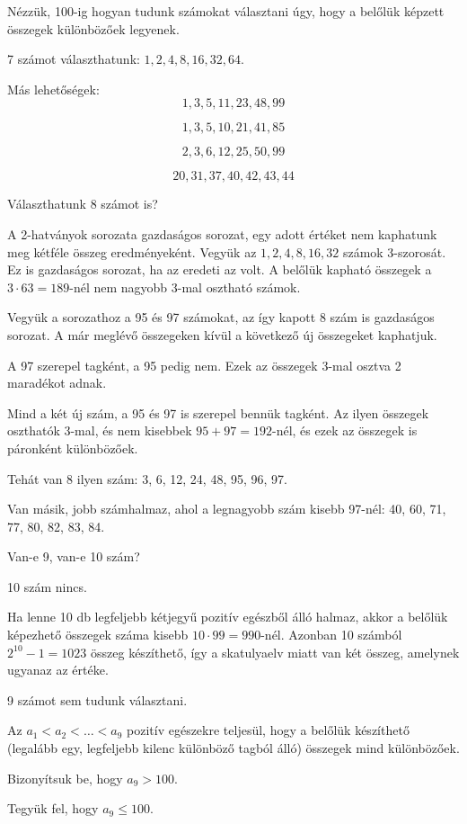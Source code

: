 \begin{solution}
	Nézzük, 100-ig hogyan tudunk számokat választani úgy, hogy a belőlük
	képzett összegek különbözőek legyenek.
	
	7 számot választhatunk: $1,2,4,8,16,32,64$.
	
	Más lehetőségek: 
	\[
	1,3,5,11,23,48,99
	\]
	
	\[
	1,3,5,10,21,41,85
	\]
	
	\[
	2,3,6,12,25,50,99
	\]
	
	\[
	20,31,37,40,42,43,44
	\]
	
	Választhatunk 8 számot is?
	
	A 2-hatványok sorozata gazdaságos sorozat, egy adott értéket nem kaphatunk
	meg kétféle összeg eredményeként. Vegyük az $1,2,4,8,16,32$ számok
	3-szorosát. Ez is gazdaságos sorozat, ha az eredeti az volt. A belőlük
	kapható összegek a $3\cdot63=189$-nél nem nagyobb 3-mal osztható
	számok.
	
	Vegyük a sorozathoz a 95 és 97 számokat, az így kapott 8 szám is gazdaságos
	sorozat. A már meglévő összegeken kívül a következő új összegeket
	kaphatjuk.
	
	A 97 szerepel tagként, a 95 pedig nem. Ezek az összegek 3-mal osztva
	2 maradékot adnak.
	
	Mind a két új szám, a 95 és 97 is szerepel bennük tagként. Az ilyen
	összegek oszthatók 3-mal, és nem kisebbek $95+97=192$-nél, és ezek
	az összegek is páronként különbözőek.
	
	Tehát van 8 ilyen szám: 3, 6, 12, 24, 48, 95, 96, 97.
	
	Van másik, jobb számhalmaz, ahol a legnagyobb szám kisebb 97-nél:
	40, 60, 71, 77, 80, 82, 83, 84.
	
	Van-e 9, van-e 10 szám?
	
	10 szám nincs.
	
	Ha lenne 10 db legfeljebb kétjegyű pozitív egészből álló halmaz, akkor
	a belőlük képezhető összegek száma kisebb $10\cdot99=990$-nél. Azonban
	10 számból $2^{10}-1=1023$ összeg készíthető, így a skatulyaelv miatt
	van két összeg, amelynek ugyanaz az értéke.
	
	9 számot sem tudunk választani.
	
	Az $a_{1}<a_{2}<\dots<a_{9}$ pozitív egészekre teljesül, hogy a belőlük
	készíthető (legalább egy, legfeljebb kilenc különböző tagból álló)
	összegek mind különbözőek.
	
	Bizonyítsuk be, hogy $a_{9}>100$.
	
	Tegyük fel, hogy $a_{9}\leq100$.
	

\end{solution}
